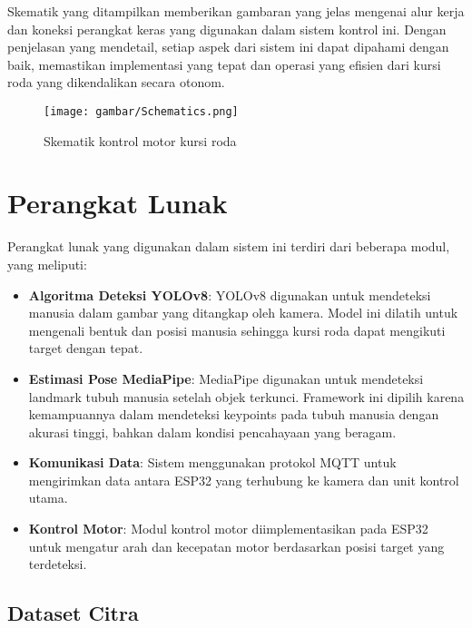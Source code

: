 Skematik yang ditampilkan memberikan gambaran yang jelas mengenai alur kerja dan koneksi perangkat keras yang digunakan dalam sistem kontrol ini. Dengan penjelasan yang mendetail, setiap aspek dari sistem ini dapat dipahami dengan baik, memastikan implementasi yang tepat dan operasi yang efisien dari kursi roda yang dikendalikan secara otonom. \parencite{ekatama2024perancangan}

\begin{figure}[H]
  \centering

  \texttt{[image: gambar/Schematics.png]}

  \caption{Skematik kontrol motor kursi roda}
  \label{fig:Skematik Kontrol motor Kursi roda.}
\end{figure}

\section{Perangkat Lunak}
\label{sec:perangkatlunak}

Perangkat lunak yang digunakan dalam sistem ini terdiri dari beberapa modul, yang meliputi:

\begin{itemize}[nolistsep]
    \item \textbf{Algoritma Deteksi YOLOv8}: YOLOv8 digunakan untuk mendeteksi manusia dalam gambar yang ditangkap oleh kamera. Model ini dilatih untuk mengenali bentuk dan posisi manusia sehingga kursi roda dapat mengikuti target dengan tepat.
    \item \textbf{Estimasi Pose MediaPipe}: MediaPipe digunakan untuk mendeteksi landmark tubuh manusia setelah objek terkunci. Framework ini dipilih karena kemampuannya dalam mendeteksi keypoints pada tubuh manusia dengan akurasi tinggi, bahkan dalam kondisi pencahayaan yang beragam.
    \item \textbf{Komunikasi Data}: Sistem menggunakan protokol MQTT untuk mengirimkan data antara ESP32 yang terhubung ke kamera dan unit kontrol utama.
    \item \textbf{Kontrol Motor}: Modul kontrol motor diimplementasikan pada ESP32 untuk mengatur arah dan kecepatan motor berdasarkan posisi target yang terdeteksi.
\end{itemize}

\subsection{Dataset Citra}
\label{subsec:datasetcitra}


